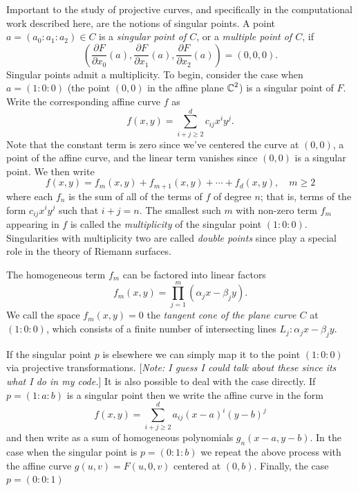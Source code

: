 Important to the study of projective curves, and specifically in the
computational work described here, are the notions of singular points. A
point $a = (a_0 : a_1 : a_2) \in C$ is a {\it singular point of $C$}, or
a {\it multiple point of $C$}, if
\[
  \left(
    \frac{\partial F}{\partial x_0} (a),
    \frac{\partial F}{\partial x_1} (a),
    \frac{\partial F}{\partial x_2} (a)
  \right)
  = (0,0,0).
\]
Singular points admit a multiplicity. To begin, consider the case when
$a = (1 : 0 : 0)$ (the point $(0,0)$ in the affine plane $\operatorname{\mathbb{C}}^2$) is a
singular point of $F$. Write the corresponding affine curve $f$ as
\[
  f(x,y) = \sum_{i+j \geq 2}^d c_{ij} x^iy^j.
\]
Note that the constant term is zero since we've centered the curve at
$(0, 0)$, a point of the affine curve, and the linear term vanishes
since $(0,0)$ is a singular point. We then write
\[
  f(x,y) = f_m(x,y) + f_{m+1}(x,y) + \cdots + f_d(x,y), \quad m \geq 2
\]
where each $f_n$ is the sum of all of the terms of $f$ of degree $n$;
that is, terms of the form $c_{ij}x^iy^j$ such that $i+j=n$. The
smallest such $m$ with non-zero term $f_m$ appearing in $f$ is called
the {\it multiplicity} of the singular point $(1 : 0 :
0)$. Singularities with multiplicity two are called {\it double points}
since play a special role in the theory of Riemann surfaces.

The homogeneous term $f_m$ can be factored into linear factors
\[
  f_m(x,y) = \prod_{j=1}^m (\alpha_j x - \beta_j y).
\]
We call the space $f_m(x,y) = 0$ the {\it tangent cone of the plane
  curve $C$} at $(1 : 0 : 0)$, which consists of a finite number of
intersecting lines $L_j : \alpha_j x - \beta_j y$.

If the singular point $p$ is elsewhere we can simply map it to the point
$(1 : 0 : 0)$ via projective transformations. [{\it Note: I guess I
    could talk about these since its what I do in my code.}] It is also
possible to deal with the case directly. If $p = (1 : a : b)$ is a
singular point then we write the affine curve in the form
\[
    f(x,y) = \sum_{i+j \geq 2}^d a_{ij} (x-a)^i(y-b)^j
\]
and then write as a sum of homogeneous polynomials $g_n(x-a,y-b)$. In the
case when the singular point is $p = (0 : 1 : b)$ we repeat the above
process with the affine curve $g(u,v) = F(u,0,v)$ centered at
$(0,b)$. Finally, the case $p = (0 : 0 : 1)$

